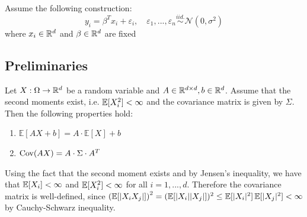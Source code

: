 Assume the following construction:
\[y_i = \beta^T x_i + \varepsilon_i, \quad \varepsilon_1, ..., \varepsilon_n \overset{iid.}{\sim} \mathcal{N}(0, \sigma^2)\]
where $x_i \in \mathbb{R}^d$ and $\beta \in \mathbb{R}^d$ are fixed

\subsection{Preliminaries}
\begin{lemma}                                                                      
    Let $X: \Omega \to \mathbb{R}^d$ be a random variable and $A \in \mathbb{R}^{d \times d}, b \in \mathbb{R}^d$. Assume that the second moments exist, i.e. $\operatorname{\mathbb{E}} [X_i^2] < \infty$ and the covariance matrix is given by $\Sigma$. Then the following properties hold:
    \begin{enumerate}[label=Property \thelemma.\arabic*, align=left]
        \item \label{prop:expectation linearity} $\mathbb{E}[AX + b] = A \cdot \mathbb{E}[X] + b$
        \item \label{prop:covariance linearity} $\operatorname{Cov} (AX) = A \cdot \Sigma \cdot A^T$
    \end{enumerate}
\end{lemma}
\begin{remark}                                                    
    Using the fact that the second moment exists and by Jensen's inequality, we have that $\operatorname{\mathbb{E}}[X_i] < \infty$ and $\operatorname{\mathbb{E}}[X_i^2] < \infty$ for all $i = 1, ..., d$. Therefore the covariance matrix is well-defined, since $\left(\operatorname{\mathbb{E}} [|X_i X_j|]\right)^2 = (\operatorname{\mathbb{E}} [|X_i| |X_j|])^2 \leq \operatorname{\mathbb{E}} [|X_i|^2] \operatorname{\mathbb{E}} [|X_j|^2] < \infty$ by Cauchy-Schwarz inequality.
\end{remark}

